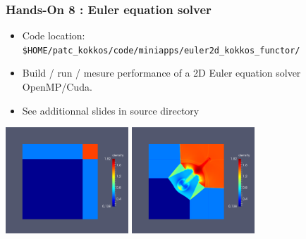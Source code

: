 \begin{frame}[fragile=singleslide]
  \frametitle{Hands-On 8 : Euler equation solver}

  \hypertarget{handson8}{}
  \begin{itemize}
  \item Code location: \texttt{\$HOME/patc\_kokkos/code/miniapps/euler2d\_kokkos\_functor/}
  \item Build / run / mesure performance of a 2D Euler equation solver OpenMP/Cuda.
  \item See additionnal slides in source directory
  \end{itemize}
  
  \begin{center}
    \includegraphics[height=4cm]{../euler/images/riemann/riemann_1}
    \hspace{0.1cm}
    \includegraphics[height=4cm]{../euler/images/riemann/riemann_2}
  \end{center}


\end{frame}
